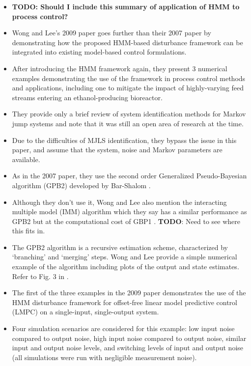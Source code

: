 \begin{itemize}
	\item \textbf{TODO: Should I include this summary of application of HMM to process control?}
	\item Wong and Lee's 2009 paper \cite{wong_realistic_2009} goes further than their 2007 paper \cite{wong_disturbance_2007} by demonstrating how the proposed HMM-based disturbance framework can be integrated into existing model-based control formulations.
	\item After introducing the HMM framework again, they present 3 numerical examples demonstrating the use of the framework in process control methods and applications, including one to mitigate the impact of highly-varying feed streams entering an ethanol-producing bioreactor.
	\item They provide only a brief review of system identification methods for Markov jump systems and note that it was still an open area of research at the time.
	\item Due to the difficulties of MJLS identification, they bypass the issue in this paper, and assume that the system, noise and Markov parameters are available.
	\item As in the 2007 paper, they use the second order Generalized Pseudo-Bayesian algorithm (GPB2) developed by Bar-Shalom \cite{bar-shalom_estimation_1993}.
	\item Although they don't use it, Wong and Lee also mention the interacting multiple model (IMM) algorithm which they say has a similar performance as GPB2 but at the computational cost of GBP1 \cite{wong_realistic_2009}. \textbf{TODO}: Need to see where this fits in.
	\item The GPB2 algorithm is a recursive estimation scheme, characterized by `branching' and `merging' steps. Wong and Lee provide a simple numerical example of the algorithm including plots of the output and state estimates. Refer to Fig. 3 in \cite{wong_realistic_2009}.
	\item The first of the three examples in the 2009 paper demonstrates the use of the HMM disturbance framework for offset-free linear model predictive control (LMPC) on a single-input, single-output system.
	\item Four simulation scenarios are considered for this example: low input noise compared to output noise, high input noise compared to output noise, similar input and output noise levels, and switching levels of input and output noise (all simulations were run with negligible measurement noise).

\end{itemize}
